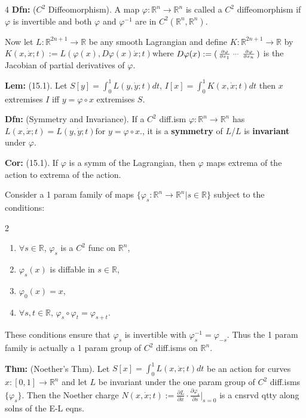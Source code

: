 \documentclass[landscape, 8pt]{extarticle}
\begin{document}
\begin{multicols*}{4}
		\textbf{Dfn:} ($C^2$ Diffeomorphism). A map $\varphi:\mathbb{R}^n\to\mathbb{R}^n$ is called a $C^2$ diffeomorphism if $\varphi$ is invertible and both $\varphi$ and $\varphi^{-1}$ are in $C^2(\mathbb{R}^n,\mathbb{R}^n)$.
		
		Now let $L:\mathbb{R}^{2n+1}\to\mathbb{R}$ be any smooth Lagrangian and define $K:\mathbb{R}^{2n+1}\to\mathbb{R}$ by
		$
		K(x,\dot{x};t):=L(\varphi(x),D\varphi(x)\dot{x};t)\text{where}
		$
		$
		D\varphi(x):=\begin{psmallmatrix*}\frac{\partial\varphi}{\partial x_1}&\cdots&\frac{\partial\varphi}{\partial x_n}\end{psmallmatrix*}
		$
		is the Jacobian of partial derivatives of $\varphi$.
		
		\textbf{Lem:} (15.1). Let $S[y]=\int_0^1 L(y,\dot{y};t)dt$, $I[x]=\int_0^1 K(x,\dot{x};t)dt$ then $x$ extremises $I$ iff $y=\varphi\circ x$ extremises $S$.
		
		\textbf{Dfn:} (Symmetry and Invariance). If a $C^2$ diff.ism $\varphi:\mathbb{R}^n\to\mathbb{R}^n$ has $L(x,\dot{x};t)=L(y,\dot{y};t)\text{for }y=\varphi\circ x.$, it is a \textbf{symmetry} of $L$/$L$ is \textbf{invariant} under $\varphi$.
		
		\textbf{Cor:} (15.1). If $\varphi$ is a symm of the Lagrangian, then $\varphi$ maps extrema of the action to extrema of the action.
		
		Consider a 1 param family of maps $\{\varphi_s:\mathbb{R}^n\to\mathbb{R}^n|s\in\mathbb{R}\}$ subject to the conditions:
		\vspace*{-10pt}
		\begin{multicols}{2}
		\begin{enumerate}[leftmargin=*,topsep=0pt,itemsep=0pt]
			\item $\forall s\in\mathbb{R}$, $\varphi_s$ is a $C^2$ func on $\mathbb{R}^n$,
			\item $\varphi_s(x)$ is diffable in $s\in\mathbb{R}$,
			\item $\varphi_0(x)=x$,
			\item $\forall s,t\in\mathbb{R}$, $\varphi_s\circ\varphi_t=\varphi_{s+t}$.
		\end{enumerate}
		\end{multicols}
		\vspace*{-10pt}
		These conditions ensure that $\varphi_s$ is invertible with $\varphi_s^{-1}=\varphi_{-s}$. Thus the 1 param family is actually a 1 param group of $C^2$ diff.isms on $\mathbb{R}^n$.
		
		\textbf{Thm:} (Noether's Thm). Let $S[x]=\int_0^1 L(x,\dot{x};t)dt$ be an action for curves $x:[0,1]\to\mathbb{R}^n$ and let $L$ be invariant under the one param group of $C^2$ diff.isms $\{\varphi_s\}$. Then the Noether charge
		$
		N(x,\dot{x};t):=\frac{\partial L}{\partial\dot{x}}\cdot\frac{\partial\varphi_s}{\partial s}\bigg|_{s=0}
		$
		is a cnsrvd qtty along solns of the E-L eqns.
		

\end{multicols*}
\end{document}
